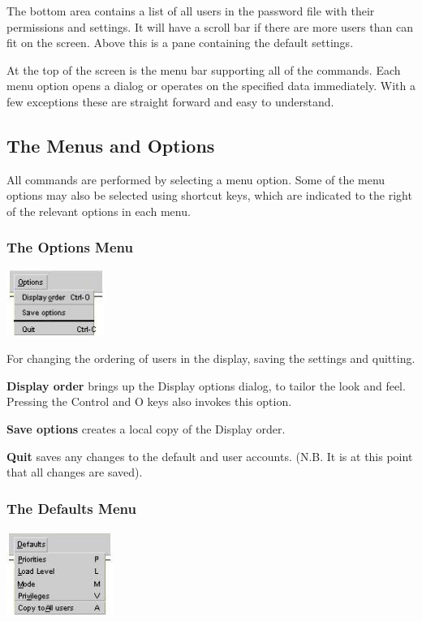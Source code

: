 The bottom area contains a list of all users in the password file with their \ProductName{} permissions and settings. It will have a scroll bar if
there are more users than can fit on the screen. Above this is a pane containing the default settings.

At the top of the screen is the menu bar supporting all of the \PrXmbtuser{} commands. Each menu option opens a
dialog or operates on the specified data immediately. With a few exceptions these are straight forward and easy to understand.

\subsection{The Menus and Options}
All commands are performed by selecting a menu option. Some of the menu options may also be selected using shortcut keys, which are indicated
to the right of the relevant options in each menu.

\subsubsection{The Options Menu}
 \includegraphics[width=3.193cm,height=2.14cm]{img/ref47.jpg}

For changing the ordering of users in the display, saving the settings and quitting.

\textbf{Display order} brings up the Display options dialog, to tailor the look and feel. Pressing the Control and O keys also invokes this
option.

\textbf{Save options} creates a local copy of the Display order.

\textbf{Quit} saves any changes to the default and user accounts. (N.B. It is at this point that all changes are saved).

\subsubsection{The Defaults Menu}
 \includegraphics[width=3.454cm,height=2.752cm]{img/ref48.jpg} 

